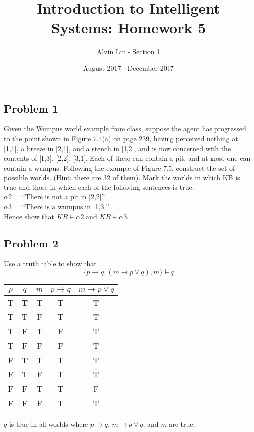 \documentclass{math}
\title{Introduction to Intelligent Systems: Homework 5}
\author{Alvin Lin - Section 1}
\date{August 2017 - December 2017}
\begin{document}
\maketitle

\subsection*{Problem 1}
Given the Wumpus world example from class, suppose the agent has progressed to
the point shown in Figure 7.4(a) on page 239, having perceived nothing at
[1,1], a breeze in [2,1], and a stench in [1,2], and is now concerned with the
contents of [1,3], [2,2], [3,1]. Each of these can contain a pit, and at most
one can contain a wumpus. Following the example of Figure 7.5, construct the
set of possible worlds. (Hint: there are 32 of them). Mark the worlds in which
KB is true and those in which each of the following sentences is true: \\
\( \alpha2 \) = ``There is not a pit in [2,2]'' \\
\( \alpha3 \) = ``There is a wumpus in [1,3]'' \\
Hence show that \( KB\models\alpha2 \) and \( KB\models\alpha3 \).

\subsection*{Problem 2}
Use a truth table to show that
\[ \{p\to q,(m\to p\vee q),m\}\models q \]
\begin{center}
  \begin{tabular}{|c|c|c|c|c|}
    \hline
    \( p \) & \( q \) & \( m \) & \( p\to q \) & \( m\to p\vee q \) \\
    \hline
    T & \textbf{T} & T & T & T \\
    T & T & F & T & T \\
    T & F & T & F & T \\
    T & F & F & F & T \\
    F & \textbf{T} & T & T & T \\
    F & T & F & T & T \\
    F & F & T & T & F \\
    F & F & F & T & T \\
    \hline
  \end{tabular}
\end{center}
\( q \) is true in all worlds where \( p\to q \), \( m\to p\vee q \), and
\( m \) are true.
\end{document}
